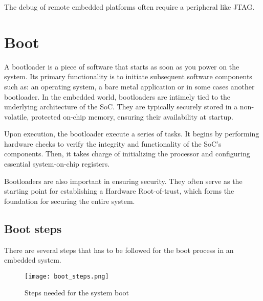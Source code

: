 The debug of remote embedded platforms often require a peripheral like JTAG.

\section{Boot}

A bootloader is a piece of software that starts as soon as you power on the
system.
Its primary functionality is to initiate subsequent software components such
as: an operating system, a bare metal application or in some cases another
bootloader.
In the embedded world, bootloaders are intimely tied to the underlying
architecture of the SoC. They are typically securely stored in a non-volatile,
protected on-chip memory, ensuring their availability at startup.

Upon execution, the bootloader execute a series of tasks. It begins by
performing hardware checks to verify the integrity and functionality of the
SoC's components. Then, it takes charge of initializing the processor and
configuring essential system-on-chip registers.

Bootloaders are also important in ensuring security. They often
serve as the starting point for establishing a Hardware Root-of-trust, which
forms the foundation for securing the entire system.

\subsection{Boot steps}

There are several steps that has to be followed for the boot process in an
embedded system.

\begin{figure}
    \centering
    \texttt{[image: boot\_steps.png]}
    \caption{Steps needed for the system boot}
\end{figure}

